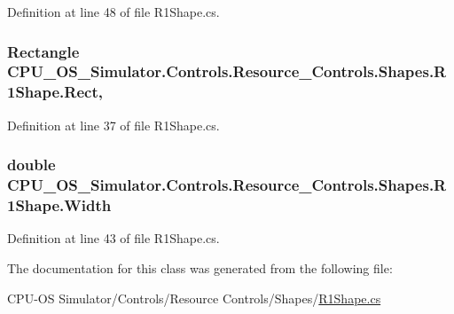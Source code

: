 Definition at line 48 of file R1\+Shape.\+cs.

\hypertarget{class_c_p_u___o_s___simulator_1_1_controls_1_1_resource___controls_1_1_shapes_1_1_r1_shape_a14327e5aac79d961afec45756e747240}{}
\subsubsection[{Rect}]{\setlength{\rightskip}{0pt plus 5cm}Rectangle C\+P\+U\+\_\+\+O\+S\+\_\+\+Simulator.\+Controls.\+Resource\+\_\+\+Controls.\+Shapes.\+R1\+Shape.\+Rect\hspace{0.3cm}{\ttfamily [get]}, {\ttfamily [set]}}\label{class_c_p_u___o_s___simulator_1_1_controls_1_1_resource___controls_1_1_shapes_1_1_r1_shape_a14327e5aac79d961afec45756e747240}


Definition at line 37 of file R1\+Shape.\+cs.

\hypertarget{class_c_p_u___o_s___simulator_1_1_controls_1_1_resource___controls_1_1_shapes_1_1_r1_shape_a4a534ce6445aa1f6074bd0c9f0271d63}{}
\subsubsection[{Width}]{\setlength{\rightskip}{0pt plus 5cm}double C\+P\+U\+\_\+\+O\+S\+\_\+\+Simulator.\+Controls.\+Resource\+\_\+\+Controls.\+Shapes.\+R1\+Shape.\+Width\hspace{0.3cm}{\ttfamily [get]}}\label{class_c_p_u___o_s___simulator_1_1_controls_1_1_resource___controls_1_1_shapes_1_1_r1_shape_a4a534ce6445aa1f6074bd0c9f0271d63}


Definition at line 43 of file R1\+Shape.\+cs.



The documentation for this class was generated from the following file\+:\begin{DoxyCompactItemize}
\item 
C\+P\+U-\/\+O\+S Simulator/\+Controls/\+Resource Controls/\+Shapes/\hyperlink{_r1_shape_8cs}{R1\+Shape.\+cs}\end{DoxyCompactItemize}
